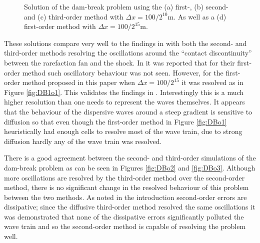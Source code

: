 \documentclass[SingleSpace,12pt,Proceedings]{Serre_ASCE}
\begin{document}
\begin{figure}
\caption{Solution of the dam-break problem using the (a) first-, (b) second- and (c) third-order method with $\Delta x = 100 /2^{10} \text{m}$. As well as a (d) first-order method with $\Delta x = 100 /2^{15} \text{m}$. }
\label{fig:DB}
\end{figure}

These solutions compare very well to the findings in  with both the second- and third-order methods resolving the oscillations around the ``contact discontinuity''\cite{El-etal-2006} between the rarefaction fan and the shock. In  it was reported that for their first-order method such oscillatory behaviour was not seen. However, for the first-order method proposed in this paper when $\Delta x = 100 /2^{15}$ it was resolved as in Figure \ref{fig:DB1o1}. This validates the findings in . Interestingly this is a much higher resolution than one needs to represent the waves themselves. It appears that the behaviour of the dispersive waves around a steep gradient is sensitive to diffusion so that even though the first-order method in Figure \ref{fig:DBo1} heuristically had enough cells to resolve most of the wave train, due to strong diffusion hardly any of the wave train was resolved. 

There is a good agreement between the second- and third-order simulations of the dam-break problem as can be seen in Figures \ref{fig:DBo2} and \ref{fig:DBo3}. Although more oscillations are resolved by the third-order method over the second-order method, there is no significant change in the resolved behaviour of this problem between the two methods. As noted in the introduction second-order errors are dissipative; since the diffusive third-order method resolved the same oscillations it was demonstrated that none of the dissipative errors significantly polluted the wave train and so the second-order method is capable of resolving the problem well.
\end{document}
